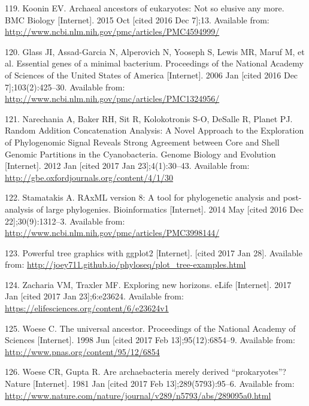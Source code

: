 \documentclass[12pt,twoside]{reedthesis}
\begin{document}
  \hypertarget{ref-koonin_archaeal_2015}{}
  119. Koonin EV. Archaeal ancestors of eukaryotes: Not so elusive any
  more. BMC Biology {[}Internet{]}. 2015 Oct {[}cited 2016 Dec 7{]};13.
  Available from:
  \url{http://www.ncbi.nlm.nih.gov/pmc/articles/PMC4594999/}
  
  \hypertarget{ref-glass_essential_2006}{}
  120. Glass JI, Assad-Garcia N, Alperovich N, Yooseph S, Lewis MR, Maruf
  M, et al. Essential genes of a minimal bacterium. Proceedings of the
  National Academy of Sciences of the United States of America
  {[}Internet{]}. 2006 Jan {[}cited 2016 Dec 7{]};103(2):425--30.
  Available from:
  \url{http://www.ncbi.nlm.nih.gov/pmc/articles/PMC1324956/}
  
  \hypertarget{ref-narechania_random_2012}{}
  121. Narechania A, Baker RH, Sit R, Kolokotronis S-O, DeSalle R, Planet
  PJ. Random Addition Concatenation Analysis: A Novel Approach to the
  Exploration of Phylogenomic Signal Reveals Strong Agreement between Core
  and Shell Genomic Partitions in the Cyanobacteria. Genome Biology and
  Evolution {[}Internet{]}. 2012 Jan {[}cited 2017 Jan 23{]};4(1):30--43.
  Available from: \url{http://gbe.oxfordjournals.org/content/4/1/30}
  
  \hypertarget{ref-stamatakis_raxml_2014}{}
  122. Stamatakis A. RAxML version 8: A tool for phylogenetic analysis and
  post-analysis of large phylogenies. Bioinformatics {[}Internet{]}. 2014
  May {[}cited 2016 Dec 22{]};30(9):1312--3. Available from:
  \url{http://www.ncbi.nlm.nih.gov/pmc/articles/PMC3998144/}
  
  \hypertarget{ref-phyloseq_powerful_2016}{}
  123. Powerful tree graphics with ggplot2 {[}Internet{]}. {[}cited 2017
  Jan 28{]}. Available from:
  \url{http://joey711.github.io/phyloseq/plot_tree-examples.html}
  
  \hypertarget{ref-zacharia_exploring_2017}{}
  124. Zacharia VM, Traxler MF. Exploring new horizons. eLife
  {[}Internet{]}. 2017 Jan {[}cited 2017 Jan 23{]};6:e23624. Available
  from: \url{https://elifesciences.org/content/6/e23624v1}
  
  \hypertarget{ref-woese_universal_1998}{}
  125. Woese C. The universal ancestor. Proceedings of the National
  Academy of Sciences {[}Internet{]}. 1998 Jun {[}cited 2017 Feb
  13{]};95(12):6854--9. Available from:
  \url{http://www.pnas.org/content/95/12/6854}
  
  \hypertarget{ref-woese_are_1981}{}
  126. Woese CR, Gupta R. Are archaebacteria merely derived
  ``prokaryotes''? Nature {[}Internet{]}. 1981 Jan {[}cited 2017 Feb
  13{]};289(5793):95--6. Available from:
  \url{http://www.nature.com/nature/journal/v289/n5793/abs/289095a0.html}
  
\end{document}
